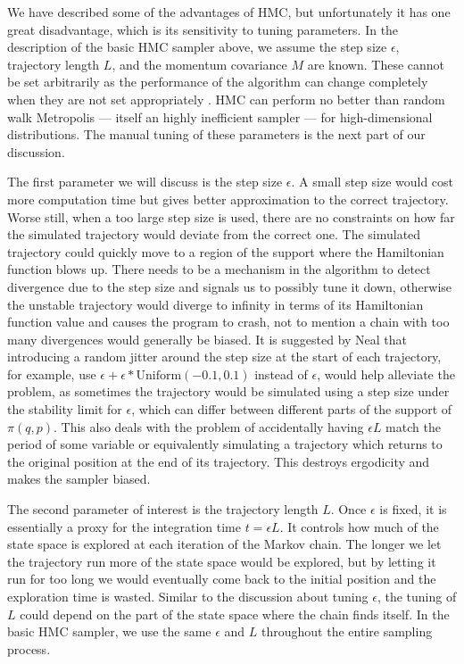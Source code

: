 \documentclass[12pt]{report}
\begin{document}
We have described some of the advantages of HMC, but unfortunately it has one great disadvantage, which is its sensitivity to tuning parameters. 
In the description of the basic HMC sampler above, we assume the step size $\epsilon$, trajectory length $L$, and the momentum covariance $M$ are known. These cannot be set arbitrarily as the performance of the algorithm can change completely when they are not set appropriately \cite{neal2011mcmc}. HMC can perform no better than random walk Metropolis --- itself an highly inefficient sampler --- for high-dimensional distributions. The manual tuning of these parameters is the next part of our discussion. 

The first parameter we will discuss is the step size $\epsilon$. A small step size would cost more computation time but gives better approximation to the correct trajectory. Worse still, when a too large step size is used, there are no constraints on how far the simulated trajectory would deviate from the correct one. The simulated trajectory could quickly move to a region of the support where the Hamiltonian function blows up. There needs to be a mechanism in the algorithm to detect divergence due to the step size and signals us to possibly tune it down, otherwise the unstable trajectory would diverge to infinity in terms of its Hamiltonian function value and causes the program to crash, not to mention a chain with too many divergences would generally be biased. It is suggested by Neal that introducing a random jitter around the step size at the start of each trajectory, for example, use $\epsilon + \epsilon*\text{Uniform}(-0.1,0.1)$ instead of $\epsilon$,  would help alleviate the problem, as sometimes the trajectory would be simulated using a step size under the stability limit for $\epsilon$, which can differ between different parts of the support of $\pi(q,p)$. This also deals with the problem of accidentally having $\epsilon L$ match the period of some variable or equivalently simulating a trajectory which returns to the original position at the end of its trajectory. This destroys ergodicity and makes the sampler biased. 

The second parameter of interest is the trajectory length $L$. Once $\epsilon$ is fixed, it is essentially a proxy for the integration time $t= \epsilon L$. It controls how much of the state space is explored at each iteration of the Markov chain. The longer we let the trajectory run more of the state space would be explored, but by letting it run for too long we would eventually come back to the initial position and the exploration time is wasted. Similar to the discussion about tuning $\epsilon$, the tuning of $L$ could depend on the part of the state space where the chain finds itself. In the basic HMC sampler, we use the same $\epsilon$ and $L$ throughout the entire sampling process.  
\end{document}
